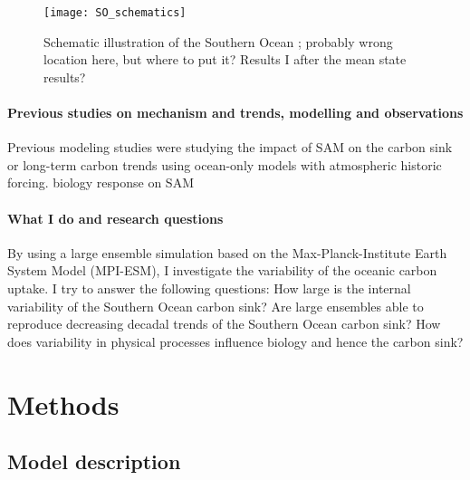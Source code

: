 \documentclass[12pt]{article}
\begin{document}
 
\begin{figure}[h!]
\centering
\texttt{[image: SO\_schematics]}
\vspace{-3mm}
\caption{Schematic illustration of the Southern Ocean ; probably wrong location here, but where to put it? Results I after the mean state results?}
\end{figure}

\paragraph{Previous studies on mechanism and trends, modelling and observations}
Previous modeling studies were studying the impact of SAM on the carbon sink \citep{Lovenduski2007,Hauck2013} or long-term carbon trends \citep{wang2012} using ocean-only models with atmospheric historic forcing. biology response on SAM \citep{Lovenduski2005}


\paragraph{What I do and research questions}
By using a large ensemble simulation based on the Max-Planck-Institute Earth System Model (MPI-ESM), I investigate the variability of the oceanic carbon uptake. I try to answer the following questions: How large is the internal variability of the Southern Ocean carbon sink? Are large ensembles able to reproduce decreasing decadal trends of the Southern Ocean carbon sink? How does variability in physical processes influence biology and hence the carbon sink?



\section{Methods}

\subsection{Model description}
\end{document}
